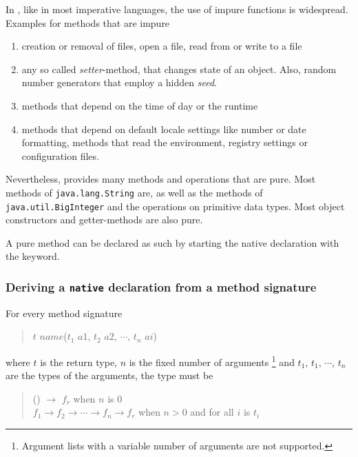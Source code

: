 In \java{}, like in most imperative languages, the use of impure functions is widespread.
Examples for methods that are impure
\begin{enumerate}
\item creation or removal of files, open a file, read from or write to a file
\item any so called \emph{setter}-method, that changes state of an object. Also, random number generators that employ a hidden \emph {seed}.
\item methods that depend on the time of day or the runtime
\item methods that depend on default locale settings like number or date formatting, methods that read the environment, registry settings or configuration files.
\end{enumerate}

Nevertheless, \java{} provides many methods and operations that are pure. Most methods of {\tt java.lang.String} are, as well as the methods of {\tt java.util.BigInteger} and the operations on primitive data types. Most object constructors and getter-methods are also pure.

A pure \java{} method can be declared as such by starting the native declaration with the  keyword.


\subsubsection{Deriving a \frege{} \texttt{native} declaration from a \java{} method signature}

For every \java{} method signature

\begin{quote}
\begin{flushleft}
$t$ $name$($t_1$ $a1$, $t_2$ $a2$, $\cdots$, $t_n$ $ai$)
\end{flushleft}
\end{quote}

where $t$ is the return type, $n$ is the fixed number of arguments
\footnote{Argument lists with a variable number of arguments are not supported.}
 and $t_1$, $t_1$, $\cdots$, $t_n$  are the types of the arguments, the \frege{} type must be

\begin{quote}
\begin{flushleft}
() $ \rightarrow{}$ $f_r$  when $n$ is 0\\
$f_1  \rightarrow{} f_2  \rightarrow{}\cdots \rightarrow{}  f_n  \rightarrow{} f_r$  when $n>0$ and for all $i$  is $t_i$\\
\end{flushleft}
\end{quote}

